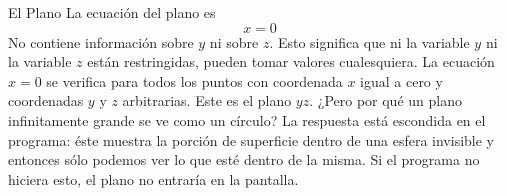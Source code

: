 \begin{surferPage}{El Plano}
La ecuaci\'on del plano es \[x=0\] No contiene informaci\'on sobre $y$ ni sobre $z$. Esto significa que ni la variable $y$ ni la variable $z$ est\'an restringidas, pueden tomar valores cualesquiera. La ecuaci\'on $x=0$ se verifica para todos los puntos con coordenada $x$ igual a cero y coordenadas $y$ y $z$ arbitrarias. Este es el plano $yz$.
\newline \newline
¿Pero por qu\'e un plano infinitamente grande se ve como un c\'irculo? La respuesta est\'a escondida en el programa: \'este muestra la porci\'on de superficie dentro de una esfera invisible y entonces s\'olo podemos ver lo que est\'e dentro de la misma. Si el programa no hiciera esto, el plano no entrar\'ia en la pantalla.
\end{surferPage}
